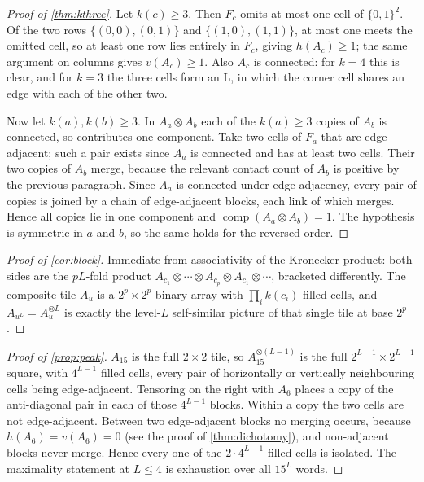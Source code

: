 \documentclass[11pt]{amsart}
\theoremstyle{definition}
\theoremstyle{remark}
\begin{document}
\begin{proof}[Proof of \cref{thm:kthree}]
Let $k(c) \ge 3$. Then $F_c$ omits at most one cell of $\{0,1\}^2$. Of the two rows $\{(0,0),(0,1)\}$ and $\{(1,0),(1,1)\}$, at most one meets the omitted cell, so at least one row lies entirely in $F_c$, giving $h(A_c) \ge 1$; the same argument on columns gives $v(A_c) \ge 1$. Also $A_c$ is connected: for $k = 4$ this is clear, and for $k = 3$ the three cells form an L, in which the corner cell shares an edge with each of the other two.

Now let $k(a), k(b) \ge 3$. In $A_a \otimes A_b$ each of the $k(a) \ge 3$ copies of $A_b$ is connected, so contributes one component. Take two cells of $F_a$ that are edge-adjacent; such a pair exists since $A_a$ is connected and has at least two cells. Their two copies of $A_b$ merge, because the relevant contact count of $A_b$ is positive by the previous paragraph. Since $A_a$ is connected under edge-adjacency, every pair of copies is joined by a chain of edge-adjacent blocks, each link of which merges. Hence all copies lie in one component and $\operatorname{comp}(A_a \otimes A_b) = 1$. The hypothesis is symmetric in $a$ and $b$, so the same holds for the reversed order.
\end{proof}

\begin{proof}[Proof of \cref{cor:block}]
Immediate from associativity of the Kronecker product: both sides are the $pL$-fold product $A_{c_1} \otimes \cdots \otimes A_{c_p} \otimes A_{c_1} \otimes \cdots$, bracketed differently. The composite tile $A_u$ is a $2^p \times 2^p$ binary array with $\prod_i k(c_i)$ filled cells, and $A_{u^L} = A_u^{\otimes L}$ is exactly the level-$L$ self-similar picture of that single tile at base $2^p$.
\end{proof}

\begin{proof}[Proof of \cref{prop:peak}]
$A_{15}$ is the full $2 \times 2$ tile, so $A_{15}^{\otimes (L-1)}$ is the full $2^{L-1} \times 2^{L-1}$ square, with $4^{L-1}$ filled cells, every pair of horizontally or vertically neighbouring cells being edge-adjacent. Tensoring on the right with $A_6$ places a copy of the anti-diagonal pair in each of those $4^{L-1}$ blocks. Within a copy the two cells are not edge-adjacent. Between two edge-adjacent blocks no merging occurs, because $h(A_6) = v(A_6) = 0$ (see the proof of \cref{thm:dichotomy}), and non-adjacent blocks never merge. Hence every one of the $2 \cdot 4^{L-1}$ filled cells is isolated. The maximality statement at $L \le 4$ is exhaustion over all $15^L$ words.
\end{proof}
\end{document}
